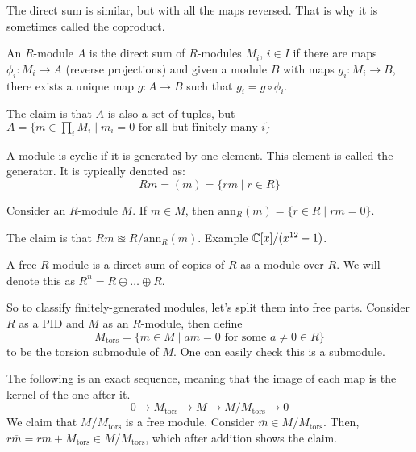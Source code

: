 The direct sum is similar, but with all the maps reversed. That is why it
is sometimes called the coproduct.
\begin{definition}
    An $R$-module $A$ is the direct sum of $R$-modules $M_i$, $i \in I$ if there are maps $\phi_i: M_i \to A$ (reverse projections) and given
    a module $B$ with maps $g_i: M_i \to B$, there exists a unique map $g: A \to B$ such that $g_i = g \circ \phi_i$.
\end{definition}
The claim is that $A$ is also a set of tuples, but $A = \{ m \in \prod_i M_i \mid m_i = 0 \text{ for all but finitely many $i$} \}$
\begin{definition}
    A module is cyclic if it is generated by one element. This element is called the generator. It is typically denoted as:
    \[ Rm = (m) = \{ rm \mid r \in R \} \]
\end{definition}
\begin{definition}
    Consider an $R$-module $M$. If $m \in M$, then $\textrm{ann}_R(m) = \{ r \in R \mid rm = 0\}$.
\end{definition}
The claim is that $Rm \approxeq R / \textrm{ann}_R(m)$. Example $\operatorname{\mathbb{C}}[x]/(x^{12} - 1)$.
\begin{definition}
    A free $R$-module is a direct sum of copies of $R$ as a module over $R$. We will denote this as $R^n = R \oplus \dots \oplus R$.
\end{definition}
So to classify finitely-generated modules, let's split them into free parts. Consider $R$ as a PID and $M$ as an $R$-module,
then define \[M_{\text{tors}} = \{m \in M \mid am = 0 \text{ for some $a \neq 0 \in R$}\}\] to be the torsion submodule of $M$.
One can easily check this is a submodule.

The following is an exact sequence, meaning that the image of each map is the kernel of the one after it.
\[ 0 \to M_{\text{tors}} \to M \to M / M_{\text{tors}} \to 0 \]
We claim that $M / M_{\text{tors}}$ is a free module. Consider $\overline{m} \in M/M_{\text{tors}}$. Then, $r\overline{m} = rm + M_{\text{tors}} \in M/M_{\text{tors}}$,
which after addition shows the claim.